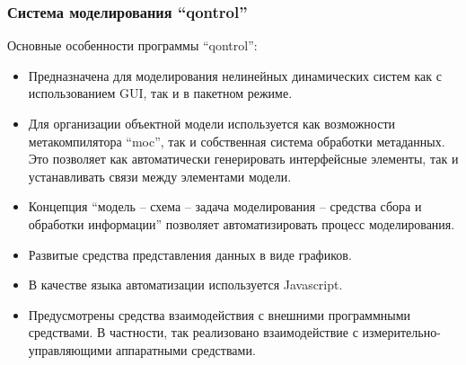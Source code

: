 \documentclass[10pt,utf8]{beamer}
\begin{document}
%
%
%
%
%



\begin{frame}
  \frametitle{Система моделирования ``qontrol''}

  Основные особенности программы ``qontrol'':

  \begin{itemize}

    \item
      Предназначена для моделирования нелинейных динамических систем
      как с использованием GUI, так и в пакетном режиме.

    \item
      Для организации объектной модели используется как возможности
      метакомпилятора ``moc'', так и собственная система обработки метаданных.
      Это позволяет как автоматически генерировать интерфейсные элементы,
      так и устанавливать связи между элементами модели.

    \item
      Концепция ``модель -- схема -- задача моделирования -- средства сбора и обработки информации''
      позволяет автоматизировать процесс моделирования.

    \item
      Развитые средства представления данных в виде графиков.

    \item
      В качестве языка автоматизации используется Javascript.

    \item
      Предусмотрены средства взаимодействия с внешними программными средствами.
      В частности, так реализовано взаимодействие с измерительно-управляющими
      аппаратными средствами.


  \end{itemize}



\end{frame}
\end{document}
